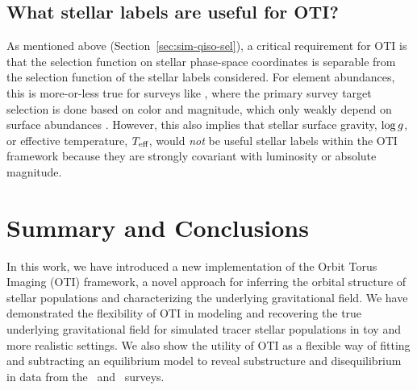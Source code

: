 \subsection{What stellar labels are useful for OTI?} \label{sec:disc-what-labels}

As mentioned above (Section~\ref{sec:sim-qiso-sel}), a critical requirement for OTI is
that the selection function on stellar phase-space coordinates is separable from the
selection function of the stellar labels considered.
For element abundances, this is more-or-less true for surveys like \apogee, where the
primary survey target selection is done based on color and magnitude, which only weakly
depend on surface abundances \citep{Zasowski:2017, Santana:2021, Beaton:2021}.
However, this also implies that stellar surface gravity, $\log g$, or effective
temperature, $T_{\textrm{eff}}$, would \emph{not} be useful stellar labels within the OTI framework
because they are strongly covariant with luminosity or absolute magnitude.


\section{Summary and Conclusions} \label{sec:conclusions}

In this work, we have introduced a new implementation of the Orbit Torus Imaging (OTI)
framework, a novel approach for inferring the orbital structure of stellar populations
and characterizing the underlying gravitational field.
We have demonstrated the flexibility of OTI in modeling and recovering the true
underlying gravitational field for simulated tracer stellar populations in toy and more
realistic settings.
We also show the utility of OTI as a flexible way of fitting and subtracting an
equilibrium model to reveal substructure and disequilibrium in data from the \apogee\
and \gaia\ surveys.


